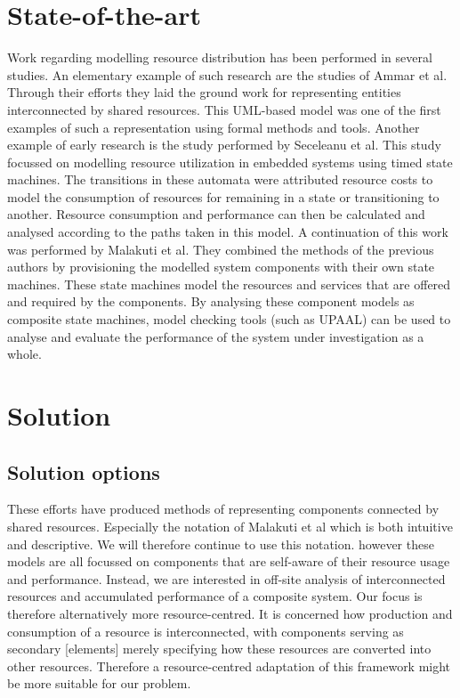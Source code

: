 \section{State-of-the-art}
Work regarding modelling resource distribution has been performed in several studies. An elementary example of such research are the studies of Ammar et al\cite{rum_basis_2}. Through their efforts they laid the ground work for representing entities interconnected by shared resources. This UML-based model was one of the first examples of such a representation using formal methods and tools. Another example of early research is the study performed by Seceleanu et al\cite{rum_basis_89}. This study focussed on modelling resource utilization in embedded systems using timed state machines. The transitions in these automata were attributed resource costs to model the consumption of resources for remaining in a state or transitioning to another. Resource consumption and performance can then be calculated and analysed according to the paths taken in this model.
A continuation of this work was performed by Malakuti et al\cite{steven-te-brinke}. They combined the methods of the previous authors by provisioning the modelled system components with their own state machines. These state machines model the resources and services that are offered and required by the components. By analysing these component models as composite state machines, model checking tools (such as UPAAL\cite{web:upaal}) can be used to analyse and evaluate the performance of the system under investigation as a whole.

\section{Solution}
\subsection{Solution options}
These efforts have produced methods of representing components connected by shared resources. Especially the notation of Malakuti et al\cite{steven-te-brinke} which is both intuitive and descriptive. We will therefore continue to use this notation.
however these models are all focussed on components that are self-aware of their resource usage and performance. Instead, we are interested in off-site analysis of interconnected resources and accumulated performance of a composite system. Our focus is therefore alternatively more resource-centred. It is concerned how production and consumption of a resource is interconnected, with components serving as secondary [elements] merely specifying how these resources are converted into other resources. Therefore a resource-centred adaptation of this framework might be more suitable for our problem.

